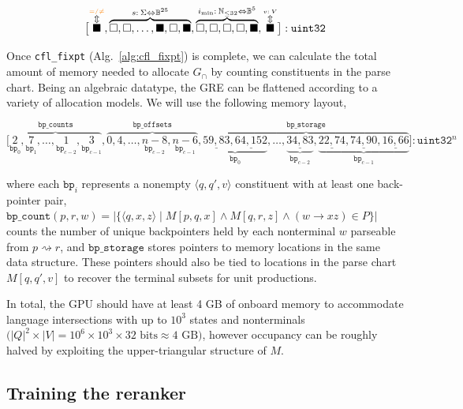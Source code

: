\documentclass[sigplan,review,acmsmall,nonacm,screen,anonymous]{acmart}\settopmatter{printfolios=false,printccs=false,printacmref=false}
\begin{document}
\[
\big[\overset{\overset{{\color{orange}=/\neq}}{\Updownarrow}}{\blacksquare}, \overbrace{\square, \square, \ldots, \blacksquare, \square, \blacksquare}^{s:\:\Sigma \Leftrightarrow \mathbb{B}^{25}}, \overbrace{\square, \square, \square, \square, \blacksquare}^{i_{\min}:\:\mathbb{N}_{\leq 32}\Leftrightarrow \mathbb{B}^{5}}, \overset{\overset{v:\:V}{\Updownarrow}}{\blacksquare}\big]: \texttt{uint32}
\]

Once \texttt{cfl\_fixpt} (Alg.~\ref{alg:cfl_fixpt}) is complete, we can calculate the total amount of memory needed to allocate $G_\cap$ by counting constituents in the parse chart. Being an algebraic datatype, the GRE can be flattened according to a variety of allocation models. We will use the following memory layout,\vspace{-0.1cm}

\[
\big[\overbrace{\underset{\texttt{bp}_0}{2}, \underset{\texttt{bp}_1}{7}, \ldots, \underset{\texttt{bp}_{c-2}}{1}, \underset{\texttt{bp}_{c-1}}{3}}^{\texttt{bp\_counts}}, \overbrace{0, 4, \ldots, \underset{\texttt{bp}_{c-2}}{n-8}, \underset{\texttt{bp}_{c-1}}{n-6}}^{\texttt{bp\_offsets}}, \overbrace{\underbrace{\underline{59,83}, \underline{64, 152}}_{\texttt{bp}_0}, \ldots, \underbrace{\underline{34, 83}}_{\texttt{bp}_{c-2}}, \underbrace{\underline{22,74},  \underline{74, 90}, \underline{16, 66}}_{\texttt{bp}_{c-1}}}^{\texttt{bp\_storage}}\big]:  \texttt{uint32}^n
\]

\noindent where each $\texttt{bp}_i$ represents a nonempty $\langle q, q', v\rangle$ constituent with at least one back-pointer pair, $\texttt{bp\_count}(p, r, w) = \big|\big\{\langle q, x, z\rangle\mid  M[p, q, x] \land M[q, r, z] \land (w \rightarrow xz)\in P\big\}\big|$ counts the number of unique backpointers held by each nonterminal $w$ parseable from $p \rightsquigarrow r$, and $\texttt{bp\_storage}$ stores pointers to memory locations in the same data structure. These pointers should also be tied to locations in the parse chart $M[q, q', v]$ to recover the terminal subsets for unit productions.

In total, the GPU should have at least 4 GB of onboard memory to accommodate language intersections with up to $10^3$ states and nonterminals $\big(|Q|^2\times|V|=10^6\times10^3\times 32 \text{ bits} \approx \text{4 GB}\big)$, however occupancy can be roughly halved by exploiting the upper-triangular structure of $M$.

\clearpage\subsection{Training the reranker}
\end{document}
